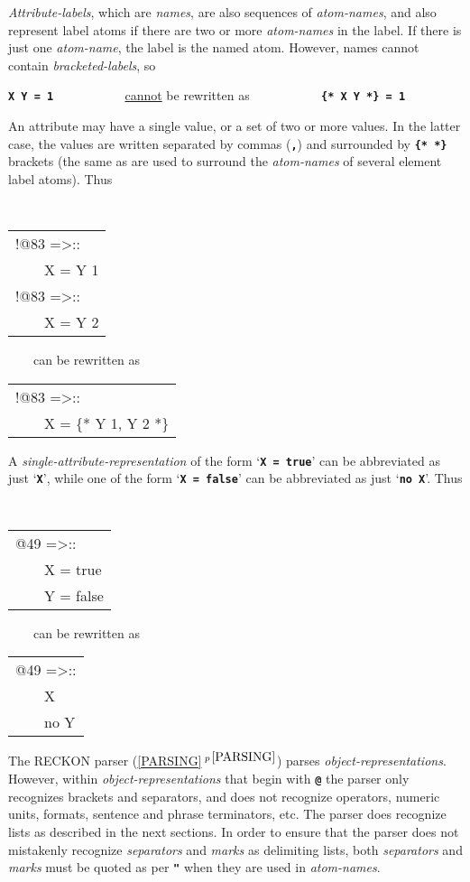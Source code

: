 \documentclass[12pt]{article}
\newcommand{\TT}[1]{{\tt \bfseries #1}}
\newcommand{\secref}[1]{\ref{#1}$\,^{p\,\pageref{#1}}$}
\begin{document}
{\em Attribute-labels}, which are {\em names}, are also sequences
of {\em atom-names}, and also represent label atoms if there are two
or more {\em atom-names} in the label.  If there is just one {\em atom-name},
the label is the named atom.  However, names
cannot contain {\em bracketed-labels},
so
\begin{center}
\TT{X Y = 1} ~~~~~~~~~~ \underline{cannot} be rewritten as ~~~~~~~~~~
         \TT{\{* X Y *\} = 1}
\end{center}

An attribute may have a single value, or a set of two or more
values.  In the latter case, the values are written separated by
commas (\TT{,}) and surrounded by \TT{\{*~*\}} brackets (the same
as are used to surround the {\em atom-names} of several element label atoms).
Thus
\begin{center}
\tt
\begin{tabular}{l}
!@83 =>:: \\
~~~~X = Y 1 \\
!@83 =>:: \\
~~~~X = Y 2 \\
\end{tabular}
~~~~{\rm can be rewritten as}~~~~
\begin{tabular}{l}
!@83 =>:: \\
~~~~X = \{* Y 1, Y 2 *\} \\
\end{tabular}
\end{center}

A {\em single-attribute-representation} of the form `\TT{X = true}'
can be abbreviated as just `\TT{X}', while one of the form
`\TT{X = false}' can be abbreviated as just `\TT{no X}'.  Thus
\begin{center}
\tt
\begin{tabular}{l}
@49 =>:: \\
~~~~X = true \\
~~~~Y = false \\
\end{tabular}
~~~~{\rm can be rewritten as}~~~~
\begin{tabular}{l}
@49 =>:: \\
~~~~X \\
~~~~no Y \\
\end{tabular}
\end{center}

The RECKON parser (\secref{PARSING}) parses {\em object-representations}.
However, within {\em object-representa\-tions} that begin with
\TT{@} the parser only recognizes brackets and separators, and does
not recognize operators, numeric units, formats, sentence and phrase
terminators, etc.\label{RAW-PARSING}  The parser does recognize
lists as described in the next sections.  In order to ensure that
the parser does not mistakenly recognize {\em separators} and {\em marks}
as delimiting lists,
both {\em separators} and {\em marks} must be quoted as per \TT{"} when
they are used in {\em atom-names}.
\end{document}
